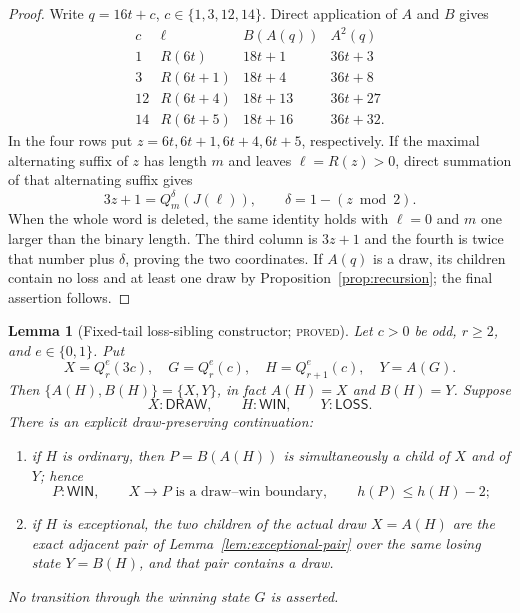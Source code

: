 \documentclass[11pt]{article}
\newtheorem{lemma}[theorem]{Lemma}
\theoremstyle{definition}
\newcommand{\Win}{\mathsf{WIN}}
\newcommand{\Loss}{\mathsf{LOSS}}
\newcommand{\Draw}{\mathsf{DRAW}}
\newcommand{\proved}{\textsc{proved}}
\begin{document}
\begin{proof}
Write $q=16t+c$, $c\in\{1,3,12,14\}$.  Direct application of $A$ and $B$
gives
\[
\begin{array}{c|c|c|c}
c&\ell&B(A(q))&A^2(q)\\ \hline
1&R(6t)&18t+1&36t+3\\
3&R(6t+1)&18t+4&36t+8\\
12&R(6t+4)&18t+13&36t+27\\
14&R(6t+5)&18t+16&36t+32.
\end{array}
\]
In the four rows put $z=6t,6t+1,6t+4,6t+5$, respectively.  If the maximal
alternating suffix of $z$ has length $m$ and leaves $\ell=R(z)>0$, direct
summation of that alternating suffix gives
\[
 3z+1=Q_m^\delta(J(\ell)),
 \qquad \delta=1-(z\bmod2).
\]
When the whole word is deleted, the same identity holds with $\ell=0$ and
$m$ one larger than the binary length.  The third column is $3z+1$ and the
fourth is twice that number plus $\delta$, proving the two coordinates.
If $A(q)$ is a draw, its children contain no loss and at least one draw by
Proposition~\ref{prop:recursion}; the final assertion follows.
\end{proof}

\begin{lemma}[Fixed-tail loss-sibling constructor; \proved]
\label{lem:fixed-tail-sibling}
Let $c>0$ be odd, $r\ge2$, and $e\in\{0,1\}$.  Put
\[
 X=Q_r^e(3c),\quad G=Q_r^e(c),\quad
 H=Q_{r+1}^e(c),\quad Y=A(G).
\]
Then $\{A(H),B(H)\}=\{X,Y\}$, in fact $A(H)=X$ and $B(H)=Y$.
Suppose
\[
 X:\Draw,\qquad H:\Win,\qquad Y:\Loss.
\]
There is an explicit draw-preserving continuation:

\begin{enumerate}
\item[(a)] if $H$ is ordinary, then $P=B(A(H))$ is simultaneously a child of
      $X$ and of $Y$; hence
      \[
      P:\Win,\qquad X\to P\text{ is a draw--win boundary},\qquad
      h(P)\le h(H)-2;
      \]
\item[(b)] if $H$ is exceptional, the two children of the actual draw $X=A(H)$
      are the exact adjacent pair of Lemma~\ref{lem:exceptional-pair} over
      the same losing state $Y=B(H)$, and that pair contains a draw.
\end{enumerate}
No transition through the winning state $G$ is asserted.
\end{lemma}
\end{document}

